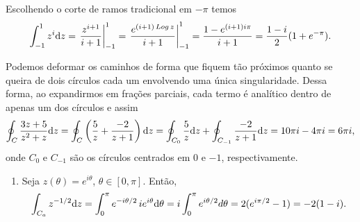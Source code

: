 \begin{questions}
%
\begin{solution}
    Escolhendo o corte de ramos tradicional em $-\pi$ temos
\begin{align*}
    \int_{-1}^1 z^i \d z %
        = \left. \frac{z^{i+1}}{i+1} \right|_{-1}^1
        = \left. \frac{e^{(i+1)\Log z}}{i+1} \right|_{-1}^1
        = \frac{1 - e^{(i+1) i\pi}}{i+1}
        = \frac{1-i}{2}(1 + e^{-\pi}).
\end{align*}
\end{solution}


\begin{solution}
Podemos deformar os caminhos de forma que fiquem tão próximos quanto se queira de dois círculos cada um envolvendo uma única singularidade. Dessa forma, ao expandirmos em frações parciais, cada termo é analítico dentro de apenas um dos círculos e assim
\begin{align*}
    \oint_C \frac{3z + 5}{z^2 + z} \mathrm{d} z
        = \oint_C \left( \frac{5}{z} + \frac{-2}{z+1} \right) \mathrm{d} z
        = \oint_{C_0} \frac{5}{z} \mathrm{d} z + \oint_{C_{-1}} \frac{-2}{z+1} \mathrm{d} z
        = 10\pi i - 4\pi i = 6\pi i,
\end{align*}
onde $C_0$ e $C_{-1}$ são os círculos centrados em $0$ e $-1$, respectivamente.
\end{solution}

\begin{solution}
    \begin{enumerate}[label=(\alph*)]
    \item Seja $z(\theta) = e^{i\theta}$, $\theta\in[0,\pi]$. Então,
        \begin{align*}
            \int_{C_a} z^{-1/2} \mathrm{d} z 
                = \int_0^\pi e^{-i\theta/2}\, i e^{i\theta} \mathrm{d} \theta
                = i \int_0^\pi e^{i\theta/2} d\theta
                = 2(e^{i\pi/2}-1)
                = -2(1-i).
        \end{align*}


\end{enumerate}
\end{solution}
\end{questions}
